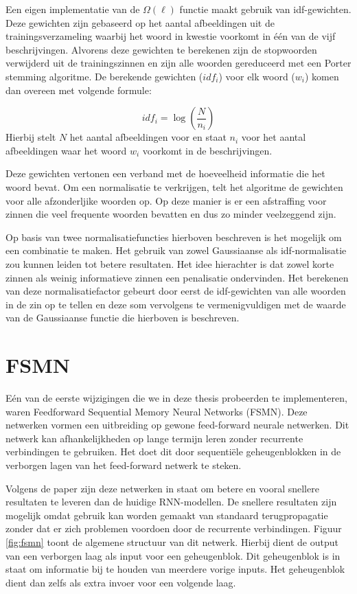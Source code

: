 Een eigen implementatie van de $\Omega(\ell)$ functie maakt gebruik van idf-gewichten. Deze gewichten zijn gebaseerd op het aantal afbeeldingen uit de trainingsverzameling waarbij het woord in kwestie voorkomt in \'e\'en van de vijf beschrijvingen. Alvorens deze gewichten te berekenen zijn de stopwoorden verwijderd uit de trainingszinnen en zijn alle woorden gereduceerd met een Porter stemming algoritme.  De berekende gewichten ($idf_i$) voor elk woord ($w_i$) komen dan overeen met volgende formule: 

\begin{equation}
    idf_i = \log(\frac{N}{n_i})
\end{equation}
Hierbij stelt $N$ het aantal afbeeldingen voor en staat $n_i$ voor het aantal afbeeldingen waar het woord $w_i$ voorkomt in de beschrijvingen.

Deze gewichten vertonen een verband met de hoeveelheid informatie die het woord bevat.  Om een normalisatie te verkrijgen, telt het algoritme de gewichten voor alle afzonderljike woorden op. Op deze manier is er een afstraffing voor zinnen die veel frequente woorden bevatten en dus zo minder veelzeggend zijn.

Op basis van twee normalisatiefuncties hierboven beschreven is het mogelijk om een combinatie te maken. Het gebruik van zowel Gaussiaanse als idf-normalisatie zou kunnen leiden tot betere resultaten. Het idee hierachter is dat zowel korte zinnen als weinig informatieve zinnen een penalisatie ondervinden. Het berekenen van deze normalisatiefactor gebeurt door eerst de idf-gewichten van alle woorden in de zin op te tellen en deze som vervolgens te vermenigvuldigen met de waarde van de Gaussiaanse functie die hierboven is beschreven.

\section{FSMN}
E\'en van de eerste wijzigingen die we in deze thesis probeerden te implementeren, waren Feedforward Sequential Memory Neural Networks (FSMN)\cite{Zhang}. Deze netwerken vormen een uitbreiding op gewone feed-forward neurale netwerken. Dit netwerk kan afhankelijkheden op lange termijn leren zonder recurrente verbindingen te gebruiken. Het doet dit door sequenti\"ele geheugenblokken in de verborgen lagen van het feed-forward netwerk te steken. 

Volgens de paper zijn deze netwerken in staat om betere en vooral snellere resultaten te leveren dan de huidige RNN-modellen. De snellere resultaten zijn mogelijk omdat gebruik kan worden gemaakt van standaard terugpropagatie zonder dat er zich problemen voordoen door de recurrente verbindingen. Figuur \ref{fig:fsmn} toont de  algemene structuur van dit netwerk. Hierbij dient de output van een verborgen laag als input voor een geheugenblok. Dit geheugenblok is in staat om informatie bij te houden van meerdere vorige inputs. Het geheugenblok dient dan zelfs als extra invoer voor een volgende laag.

